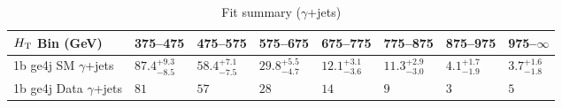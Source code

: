 \documentclass[8pt]{article}
\def\scalht{\mbox{$H_{\rm{T}}$}\xspace}
\newcommand\T{\rule{0pt}{2.6ex}}
\begin{document}
\begin{table}[ht!]
\caption{Fit summary ($\gamma$+jets)}
\label{tab:ensemble-summary}
\centering
\begin{tabular}{ llllllll }

\hline
\scalht Bin (GeV)       & 375--475                       & 475--575                       & 575--675                       & 675--775                       & 775--875                       & 875--975                       & 975--$\infty$                  \\ [1.000000ex]
\hline
1b ge4j SM $\gamma$+jets\T & $87.4^{+9.3}_{-8.5}$           & $58.4^{+7.1}_{-7.5}$           & $29.8^{+5.5}_{-4.7}$           & $12.1^{+3.1}_{-3.6}$           & $11.3^{+2.9}_{-3.0}$           & $4.1^{+1.7}_{-1.9}$            & $3.7^{+1.6}_{-1.8}$            \\ 
1b ge4j Data $\gamma$+jets\T & $81$                           & $57$                           & $28$                           & $14$                           & $9$                            & $3$                            & $5$                            \\ 
\hline

\end{tabular}
\end{table}
\end{document}
